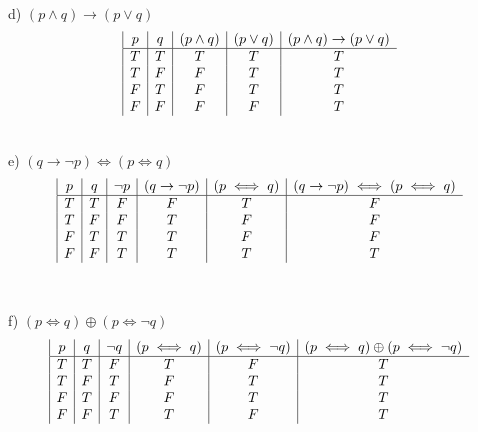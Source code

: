 \documentclass{article}
\begin{document}
\begin{flushleft}
~\\\setlength\parindent{24pt}d) $(p \land q) \rightarrow (p \lor q)$ \\
\begin{displaymath}
\begin{array}{| c | c | c | c | c}
$$p$$
& $$q$$
& $$(p \land q)$$
& $$(p \lor q)$$
& $$(p \land q) \rightarrow (p \lor q)$$ \\ \hline
T & T & T & T & T \\ 
T & F & F & T & T \\
F & T & F & T & T \\
F & F & F & F & T \\
\end{array}
\end{displaymath}

~\\\setlength\parindent{24pt}e) $(q \rightarrow \neg p) \iff (p \iff q)$ \\ 
\begin{displaymath}
\begin{array}{| c | c | c | c | c | c}
$$p $$
&$$ q $$
&$$\neg p$$
&$$(q \rightarrow \neg p)$$
&$$(p \iff q)$$
&$$(q \rightarrow \neg p) \iff (p \iff q)$$ \\ \hline

T & T & F & F & T & F \\
T & F & F & T & F & F \\
F & T & T & T & F & F \\
F & F & T & T & T & T \\

\end{array}
\end{displaymath}
~\\~\\\setlength\parindent{24pt}f) $(p \iff q) \oplus (p \iff \neg q)$ \\ 

\begin{displaymath}
\begin{array}{| c | c | c | c | c | c}
$$p $$
&$$ q $$
&$$\neg q$$
&$$(p \iff q)$$
&$$(p \iff \neg q)$$
&$$(p \iff q) \oplus (p \iff \neg q)$$ \\ \hline

T & T & F & T & F & T \\
T & F & T & F & T & T \\
F & T & F & F & T & T \\
F & F & T & T & F & T \\


\end{array}
\end{displaymath}
\end{flushleft}
\end{document}
